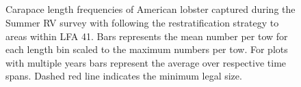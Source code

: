 \documentclass[11pt]{article}
\newcommand{\D}{.}
\newcommand{\e}{/backup/bio_data/bio.lobster/figures/} %
\begin{document}

\begin{figure}
\centering

\\
			\\
			\\
			\\
 \caption{Carapace length frequencies of American lobster captured during the Summer RV survey with following the restratification strategy to areas within LFA 41. Bars represents the mean number per tow for each length bin scaled to the maximum numbers per tow. For plots with multiple years bars represent the average over respective time spans. Dashed red line indicates the minimum legal size.}
\end{figure}
\clearpage
\end{document}
